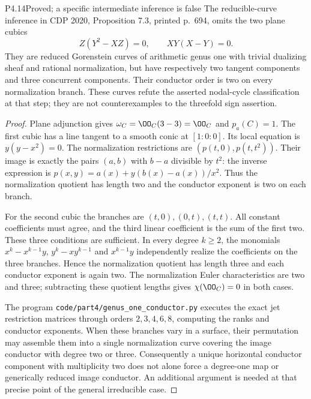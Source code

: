 \begin{statement}{P4.14}{Proved; a specific intermediate inference is false}
The reducible-curve inference in CDP 2020, Proposition 7.3,
printed p.~694, omits the two plane cubics
\[
 Z(Y^2-XZ)=0,\qquad XY(X-Y)=0.
\]
They are reduced Gorenstein curves of arithmetic genus one with
trivial dualizing sheaf and rational normalization, but have
respectively two tangent components and three concurrent
components. Their conductor order is two on every normalization
branch. These curves refute the asserted nodal-cycle
classification at that step; they are not counterexamples to
the threefold sign assertion.
\end{statement}
\begin{proof}
Plane adjunction gives $\omega_C=\OO_C(3-3)=\OO_C$ and
$p_a(C)=1$. The first cubic has a line tangent to a smooth
conic at $[1:0:0]$. Its local equation is $y(y-x^2)=0$.
The normalization restrictions are $(p(t,0),p(t,t^2))$.
Their image is exactly the pairs $(a,b)$ with $b-a$ divisible
by $t^2$: the inverse expression is
$p(x,y)=a(x)+y(b(x)-a(x))/x^2$. Thus the normalization
quotient has length two and the conductor exponent is two on
each branch.

For the second cubic the branches are $(t,0),(0,t),(t,t)$.
All constant coefficients must agree, and the third linear
coefficient is the sum of the first two. These three conditions
are sufficient. In every degree $k\ge2$, the monomials
$x^k-x^{k-1}y$, $y^k-xy^{k-1}$ and $x^{k-1}y$ independently
realize the coefficients on the three branches. Hence the
normalization quotient has length three and each conductor
exponent is again two. The normalization Euler characteristics
are two and three; subtracting these quotient lengths gives
$\chi(\OO_C)=0$ in both cases.

The program \texttt{code/part4/genus\_one\_conductor.py}
executes the exact jet restriction matrices through orders
$2,3,4,6,8$, computing the ranks and conductor exponents.
When these branches vary in a surface, their permutation may
assemble them into a single normalization curve covering the
image conductor with degree two or three. Consequently a
unique horizontal conductor component with multiplicity two
does not alone force a degree-one map or generically reduced
image conductor. An additional argument is needed at that
precise point of the general irreducible case.
\end{proof}

